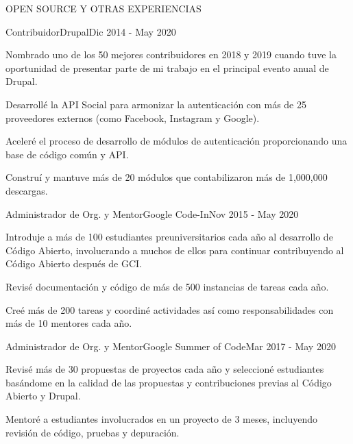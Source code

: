 \documentclass{resume} %
\begin{document}
	
	\begin{rSection}{OPEN SOURCE Y OTRAS EXPERIENCIAS}
		
		\begin{rSubsection}{Contribuidor}{Drupal}{}{Dic 2014 - May 2020}
			\item Nombrado uno de los 50 mejores contribuidores en 2018 y 2019 cuando tuve la oportunidad de presentar parte de mi trabajo en el principal evento anual de Drupal.
			\item Desarrollé la API Social para armonizar la autenticación con más de 25 proveedores externos (como Facebook, Instagram y Google).
			\item Aceleré el proceso de desarrollo de módulos de autenticación proporcionando una base de código común y API.
			\item Construí y mantuve más de 20 módulos que contabilizaron más de 1,000,000 descargas.
		\end{rSubsection}
		
		\hfil
		
		\begin{rSubsection}{Administrador de Org. y Mentor}{Google Code-In}{}{Nov 2015 - May 2020}
			\item Introduje a más de 100 estudiantes preuniversitarios cada año al desarrollo de Código Abierto, involucrando a muchos de ellos para continuar contribuyendo al Código Abierto después de GCI.
			\item Revisé documentación y código de más de 500 instancias de tareas cada año.
			\item Creé más de 200 tareas y coordiné actividades así como responsabilidades con más de 10 mentores cada año.
		\end{rSubsection}
		
		
		\begin{rSubsection}{Administrador de Org. y Mentor}{Google Summer of Code}{}{Mar 2017 - May 2020}
			\item Revisé más de 30 propuestas de proyectos cada año y seleccioné estudiantes basándome en la calidad de las propuestas y contribuciones previas al Código Abierto y Drupal.
			\item Mentoré a estudiantes involucrados en un proyecto de 3 meses, incluyendo revisión de código, pruebas y depuración.
		\end{rSubsection}
		
	\end{rSection}
	
\end{document}
